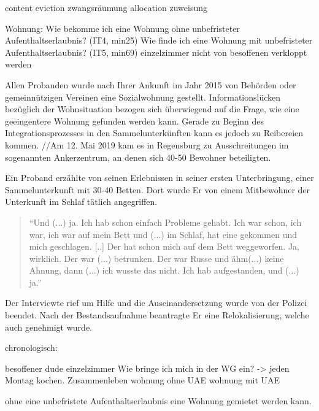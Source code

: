 \item [Wohnen]
		content
		eviction zwangsräumung
		allocation zuweisung
		
		Wohnung:
    Wie bekomme ich eine Wohnung ohne unbefristeter Aufenthaltserlaubnis? (IT4, min25)
    Wie finde ich eine Wohnung mit unbefristeter Aufenthaltserlaubnis? (IT5, min69)
    einzelzimmer
    nicht von besoffenen verkloppt werden

Allen Probanden wurde nach Ihrer Ankunft im Jahr 2015 von Behörden oder gemeinnützigen Vereinen eine Sozialwohnung gestellt. Informationslücken bezüglich der Wohnsituation bezogen sich überwiegend auf die Frage, wie eine geeingentere Wohnung gefunden werden kann. Gerade zu Beginn des Integrationsprozesses in den Sammelunterkünften kann es jedoch zu Reibereien kommen. 
//Am 12. Mai 2019 kam es in Regensburg zu Ausschreitungen im sogenannten Ankerzentrum, an denen sich 40-50 Bewohner beteiligten.

Ein Proband erzählte von seinen Erlebnissen in seiner ersten Unterbringung, einer Sammelunterkunft mit 30-40 Betten. Dort wurde Er von einem Mitbewohner der Unterkunft im Schlaf tätlich angegriffen.

\begin{quote}
    ``Und (...) ja. Ich hab schon einfach Probleme gehabt. Ich war schon, ich war, ich war auf mein Bett und (...) im Schlaf, hat eine gekommen und mich geschlagen. [..] Der hat schon mich auf dem Bett weggeworfen. Ja, wirklich. Der war (...) betrunken. Der war Russe und ähm(...) keine Ahnung, dann (...) ich wusste das nicht. Ich hab aufgestanden, und (...) ja.''
\end{quote}

Der Interviewte rief um Hilfe und die Auseinandersetzung wurde von der Polizei beendet.  Nach der Bestandsaufnahme beantragte Er eine Relokalisierung, welche auch genehmigt wurde.

chronologisch:

besoffener dude
einzelzimmer
Wie bringe ich mich in der WG ein? -> jeden Montag kochen. Zusammenleben
wohnung ohne UAE
wohnung mit UAE

ohne eine unbefristete Aufenthaltserlaubnis eine Wohnung gemietet werden kann.
